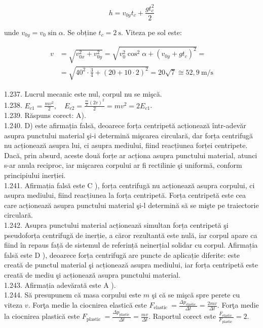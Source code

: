 $$
h=v_{0 y} t_{c}+\frac{g t_{c}^{2}}{2}
$$

unde $v_{0 y}=v_{0} \sin \alpha$. Se obține $t_{c}=2 \mathrm{~s}$. Viteza pe sol este:

$$
\begin{aligned}
v & =\sqrt{v_{0 x}^{2}+v_{0 y}^{2}}=\sqrt{v_{0}^{2} \cos ^{2} \alpha+\left(v_{0 y}+g t_{c}\right)^{2}}= \\
& =\sqrt{40^{2} \cdot \frac{3}{4}+(20+10 \cdot 2)^{2}}=20 \sqrt{7} \cong 52,9 \mathrm{~m} / \mathrm{s}
\end{aligned}
$$

1.237. Lucrul mecanic este nul, corpul nu se mişcă.\\
1.238. $E_{c 1}=\frac{m v^{2}}{2}, \quad E_{c 2}=\frac{\frac{m}{2}(2 v)^{2}}{2}=m v^{2}=2 E_{c 1}$.\\
1.239. Răspuns corect: A).\\
1.240. D) este afirmația falsă, deoarece forța centripetă acționează într-adevăr asupra punctului material şi-i determină mişcarea circulară, dar forța centrifugă nu acționează asupra lui, ci asupra mediului, fiind reacțiunea forței centripete. Dacă, prin absurd, aceste două forțe ar acționa asupra punctului material, atunci s-ar anula reciproc, iar mişcarea corpului ar fi rectilinie şi uniformă, conform principiului inerției.\\
1.241. Afirmația falsă este C ), forța centrifugă nu acționează asupra corpului, ci asupra mediului, fiind reacțiunea la forța centripetă. Forța centripetă este cea care acționează asupra punctului material şi-l determină să se mişte pe traiectorie circulară.\\
1.242. Asupra punctului material acționează simultan forța centripetă şi pseudoforța centrifugă de inerție, a căror rezultantă este nulă, iar corpul apare ca fiind în repaus față de sistemul de referință neinerțial solidar cu corpul. Afirmația falsă este D ), deoarece forța centrifugă are puncte de aplicație diferite: este creată de punctul material şi acționează asupra mediului, iar forța centripetă este creată de mediu şi acționează asupra punctului material.\\
1.243. Afirmația adevărată este A ).\\
1.244. Să presupunem că masa corpului este $m$ şi că se mişcă spre perete cu viteza $v$. Forţa medie la ciocnirea elastică este $F_{\text {elastic }}=\frac{\Delta p_{\text {elastic }}}{\Delta t}=\frac{2 m v}{\Delta t}$. Forţa medie la ciocnirea plastică este $F_{\text {plastic }}=\frac{\Delta p_{\text {plastic }}}{\Delta t}=\frac{m v}{\Delta t}$. Raportul corect este $\frac{F_{\text {elastic }}}{F_{\text {plastic }}}=2$.\\
